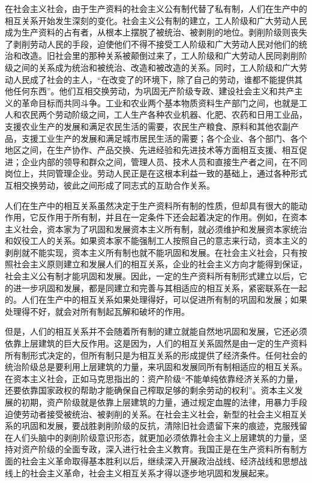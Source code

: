 \documentclass{book}
\begin{document}
在社会主义社会，由于生产资料的社会主义公有制代替了私有制，人们在生产中的相互关系开始发生深刻的变化。社会主义公有制的建立，工人阶级和广大劳动人民成为生产资料的占有者，从根本上摆脱了被统治、被剥削的地位。剥削阶级则丧失了剥削劳动人民的手段，迫使他们不得不接受工人阶级和广大劳动人民对他们的统治和改造。旧社会里的那种关系被颠倒过来了，工人阶级和广大劳动人民同剥削阶级之间的关系成为统治和被统治、改造和被改造的关系。同时，工人阶级和广大劳动人民成了社会的主人，“在改变了的环境下，除了自己的劳动，谁都不能提供其他任何东西”。他们互相交换劳动，为巩固无产阶级专政、建设社会主义和共产主义的革命目标而共同斗争。工业和农业两个基本物质资料生产部门之间，也就是工人和农民两个劳动阶级之间，工人生产各种农业机器、化肥、农药和日用工业品，支援农业生产的发展和满足农民生活的需要，农民生产粮食、原料和其他农副产品，支援工业生产的发展和满足城市居民生活的需要；各个企业、各个部门、各个地区之间，在生产协作、产品交换、先进经验和先进技术等方面相互支援、相互促进；企业内部的领导和群众之间，管理人员、技术人员和直接生产者之间，在不同岗位上，共同管理企业。劳动人民正是在这根本利益一致的基础上，通过各种形式互相交换劳动，彼此之间形成了同志式的互助合作关系。

人们在生产中的相互关系虽然决定于生产资料所有制的性质，但却具有很大的能动作用，它反作用于所有制，并且在一定条件下还会起着决定的作用。例如，在资本主义社会，资本家为了巩固和发展资本主义所有制，就必须维护和发展资本家统治和奴役工人的关系。如果资本家不能强制工人按照自己的意志来行动，资本主义的剥削就不能实现，资本主义所有制也就不能巩固和发展。在社会主义社会，只有按照社会主义原则建立和发展人们的相互关系，企业的社会主义方向才能得到保证，社会主义公有制才能巩固和发展。因此，一定的生产资料所有制形式建立以后，它的进一步巩固和发展，都是同建立和完善与其相适应的相互关系，紧密联系在一起的。人们在生产中的相互关系如果处理得好，可以促进所有制的巩固和发展；如果处理得不好，就会对所有制起瓦解和破坏的作用。

但是，人们的相互关系并不会随着所有制的建立就能自然地巩固和发展，它还必须依靠上层建筑的巨大反作用。这是因为，人们的相互关系固然是由一定的生产资料所有制形式决定的，但所有制只是为相互关系的形成提供了经济条件。任何社会的统治阶级总是要利用上层建筑的力量，来巩固和发展同所有制相适应的相互关系。在资本主义社会，正如马克思指出的：资产阶级“不能单纯依靠经济关系的力量，还要依靠国家政权的帮助才能确保自己榨取足够的剩余劳动的权利”。资本主义发展的初期，资产阶级就是依靠上层建筑的力量，通过规定血腥的法律，用暴力手段迫使劳动者接受被统治、被剥削的关系。在社会主义社会，新型的社会主义相互关系的巩固和发展，要战胜剥削阶级的反抗，清除旧社会遗留下来的痕迹，克服残留在人们头脑中的剥削阶级意识形态，就更加必须依靠社会主义上层建筑的力量，坚持对资产阶级的全面专政，深入进行社会主义教育。我国正是在生产资料所有制方面的社会主义革命取得基本胜利以后，继续深入开展政治战线、经济战线和思想战线上的社会主义革命，社会主义相互关系才得以逐步地巩固和发展起来。
\end{document}
